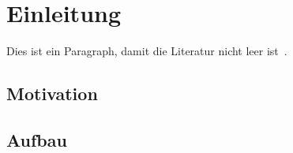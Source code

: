 
\setcounter{page}{1}

\section{Einleitung}

\lipsum[1]

Dies ist ein Paragraph, damit die Literatur nicht leer ist~\cite{atlassianGitflowWorkflow}.




\subsection{Motivation}

\lipsum[2]




\subsection{Aufbau}

\lipsum[3]
